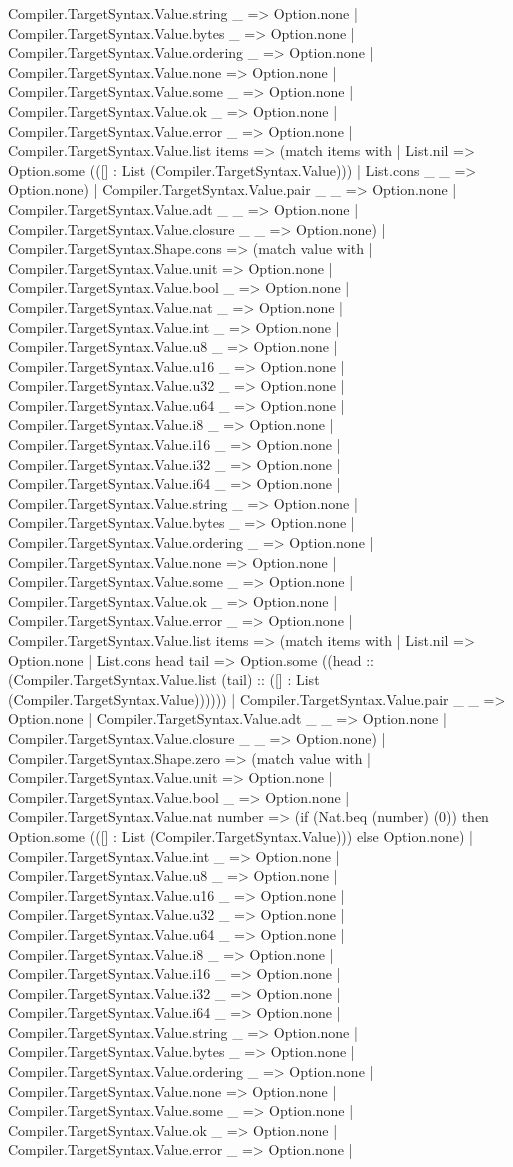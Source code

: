 \documentclass[11pt]{article}
\begin{document}
Compiler.TargetSyntax.Value.string \_ => Option.none | Compiler.TargetSyntax.Value.bytes \_ => Option.none | Compiler.TargetSyntax.Value.ordering \_ => Option.none | Compiler.TargetSyntax.Value.none => Option.none | Compiler.TargetSyntax.Value.some \_ => Option.none | Compiler.TargetSyntax.Value.ok \_ => Option.none | Compiler.TargetSyntax.Value.error \_ => Option.none | Compiler.TargetSyntax.Value.list items => (match items with | List.nil => Option.some (([] : List (Compiler.TargetSyntax.Value))) | List.cons \_ \_ => Option.none) | Compiler.TargetSyntax.Value.pair \_ \_ => Option.none | Compiler.TargetSyntax.Value.adt \_ \_ => Option.none | Compiler.TargetSyntax.Value.closure \_ \_ => Option.none) | Compiler.TargetSyntax.Shape.cons => (match value with | Compiler.TargetSyntax.Value.unit => Option.none | Compiler.TargetSyntax.Value.bool \_ => Option.none | Compiler.TargetSyntax.Value.nat \_ => Option.none | Compiler.TargetSyntax.Value.int \_ => Option.none | Compiler.TargetSyntax.Value.u8 \_ => Option.none | Compiler.TargetSyntax.Value.u16 \_ => Option.none | Compiler.TargetSyntax.Value.u32 \_ => Option.none | Compiler.TargetSyntax.Value.u64 \_ => Option.none | Compiler.TargetSyntax.Value.i8 \_ => Option.none | Compiler.TargetSyntax.Value.i16 \_ => Option.none | Compiler.TargetSyntax.Value.i32 \_ => Option.none | Compiler.TargetSyntax.Value.i64 \_ => Option.none | Compiler.TargetSyntax.Value.string \_ => Option.none | Compiler.TargetSyntax.Value.bytes \_ => Option.none | Compiler.TargetSyntax.Value.ordering \_ => Option.none | Compiler.TargetSyntax.Value.none => Option.none | Compiler.TargetSyntax.Value.some \_ => Option.none | Compiler.TargetSyntax.Value.ok \_ => Option.none | Compiler.TargetSyntax.Value.error \_ => Option.none | Compiler.TargetSyntax.Value.list items => (match items with | List.nil => Option.none | List.cons head tail => Option.some ((head :: (Compiler.TargetSyntax.Value.list (tail) :: ([] : List (Compiler.TargetSyntax.Value)))))) | Compiler.TargetSyntax.Value.pair \_ \_ => Option.none | Compiler.TargetSyntax.Value.adt \_ \_ => Option.none | Compiler.TargetSyntax.Value.closure \_ \_ => Option.none) | Compiler.TargetSyntax.Shape.zero => (match value with | Compiler.TargetSyntax.Value.unit => Option.none | Compiler.TargetSyntax.Value.bool \_ => Option.none | Compiler.TargetSyntax.Value.nat number => (if (Nat.beq (number) (0)) then Option.some (([] : List (Compiler.TargetSyntax.Value))) else Option.none) | Compiler.TargetSyntax.Value.int \_ => Option.none | Compiler.TargetSyntax.Value.u8 \_ => Option.none | Compiler.TargetSyntax.Value.u16 \_ => Option.none | Compiler.TargetSyntax.Value.u32 \_ => Option.none | Compiler.TargetSyntax.Value.u64 \_ => Option.none | Compiler.TargetSyntax.Value.i8 \_ => Option.none | Compiler.TargetSyntax.Value.i16 \_ => Option.none | Compiler.TargetSyntax.Value.i32 \_ => Option.none | Compiler.TargetSyntax.Value.i64 \_ => Option.none | Compiler.TargetSyntax.Value.string \_ => Option.none | Compiler.TargetSyntax.Value.bytes \_ => Option.none | Compiler.TargetSyntax.Value.ordering \_ => Option.none | Compiler.TargetSyntax.Value.none => Option.none | Compiler.TargetSyntax.Value.some \_ => Option.none | Compiler.TargetSyntax.Value.ok \_ => Option.none | Compiler.TargetSyntax.Value.error \_ => Option.none | 
\end{document}
